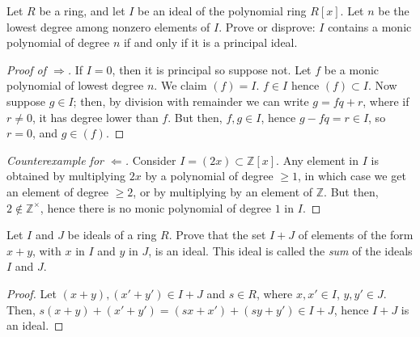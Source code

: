 \documentclass[12pt]{article}
\theoremstyle{remark}
\begin{document}
\begin{problem}
  Let $R$ be a ring, and let $I$ be an ideal of the polynomial ring $R[x]$. Let $n$ be the lowest degree among nonzero elements of $I$. Prove or disprove: $I$ contains a monic polynomial of degree $n$ if and only if it is a principal ideal.
\end{problem}
\begin{proof}[Proof of $\Rightarrow$]
  If $I = 0$, then it is principal so suppose not. Let $f$ be a monic polynomial of lowest degree $n$. We claim $(f) = I$. $f \in I$ hence $(f) \subset I$. Now suppose $g \in I$; then, by division with remainder we can write $g = fq + r$, where if $r \ne 0$, it has degree lower than $f$. But then, $f,g \in I$, hence $g - fq = r \in I$, so $r = 0$, and $g \in (f)$.
\end{proof}
\begin{proof}[Counterexample for $\Leftarrow$]
  Consider $I = (2x) \subset \mathbb{Z}[x]$. Any element in $I$ is obtained by multiplying $2x$ by a polynomial of degree $\ge1$, in which case we get an element of degree $\ge 2$, or by multiplying by an element of $\mathbb{Z}$. But then, $2 \notin \mathbb{Z}^\times$, hence there is no monic polynomial of degree $1$ in $I$.
\end{proof}

\begin{problem}
  Let $I$ and $J$ be ideals of a ring $R$. Prove that the set $I + J$ of elements of the form $x + y$, with $x$ in $I$ and $y$ in $J$, is an ideal. This ideal is called the \emph{sum} of the ideals $I$ and $J$.  
\end{problem}
\begin{proof}
  Let $(x+y),(x'+y') \in I + J$ and $s \in R$, where $x,x' \in I$, $y,y' \in J$. Then, $s(x+y) + (x' + y') = (sx + x') + (sy + y') \in I+J$, hence $I+J$ is an ideal.
\end{proof}
\end{document}
